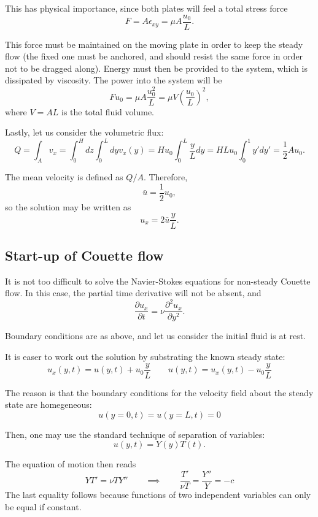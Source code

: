 This has physical importance, since both plates will feel a total
stress force
\begin{equation}
  \label{eq:Couette_force}
  F= A \epsilon_{xy} = \mu A \frac{u_0}{L} .
\end{equation}


This force must be maintained on the moving plate in order to keep the
steady flow (the fixed one must be anchored, and should resist the
same force in order not to be dragged along). Energy must then be
provided to the system, which is dissipated by viscosity. The power
into the system will be
\[
F u_0 = \mu A \frac{u_0^2}{L} = \mu V  \left( \frac{u_0}{L}\right)^2 ,
\]
where $V=AL$ is the total fluid volume.

Lastly, let us consider the volumetric flux:
\[
Q = \int_A v_x = \int_0^H dz \int_0^L dy v_x(y) =
H  u_0 \int_0^L \frac{y}{L} dy =
H L  u_0 \int_0^1 y' dy' =
\frac12 A u_0 .
\]

The mean velocity is defined as $Q/A$. Therefore,
\[
\bar{u} = \frac12 u_0 ,
\]
so the solution may be written as
\[
u_x =   2\bar{u} \frac{y}{L} .
\]




\subsection{Start-up of Couette flow}

It is not too difficult to solve the Navier-Stokes equations for
non-steady Couette flow. In this case, the partial time derivative
will not be absent, and
\[
{\frac {\partial u_x}{\partial t}}=\nu {\frac {\partial
    ^{2}u_x}{\partial y^{2}}}.
\]

Boundary conditions are as above, and let us consider the initial
fluid is at rest.

It is easer to work out the solution by substrating the known steady state:
\[
u_x(y,t) = u(y,t)  + u_0 \frac{y}{L} \qquad
u(y,t) = u_x(y,t)  - u_0 \frac{y}{L} 
\]

The reason is that the boundary conditions for the velocity field
about the steady state are homegeneous:
\[
u(y=0,t) = u(y=L,t) = 0
\]

Then, one may use the standard technique of separation of variables:
\[
u(y,t) = Y(y) T(t) .
\]

The equation of motion then reads
\[
Y T' = \nu T Y'' \qquad\implies\qquad  \frac{T'}{ \nu T} = \frac{Y''}{Y} = -c
\]
The last equality follows because functions of two independent
variables can only be equal if constant.

